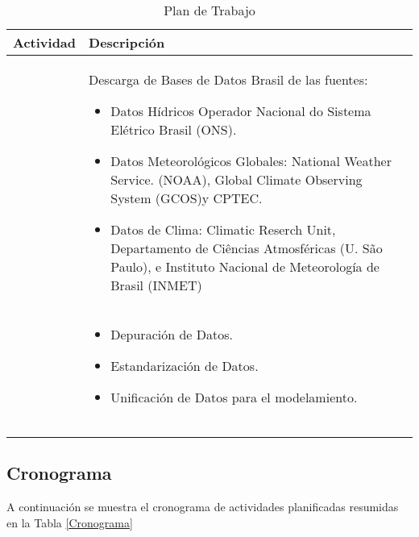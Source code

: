 \documentclass[10pt,a4paper]{article}
\begin{document}
\begin{table}[h!]
\centering

\label{TablaPlan}
\begin{tabular}{|m{2.4cm}|p{7.4cm}|}
\hline
Actividad  & Descripción  \\ \hline

\centering{Obtención de Datos} &  Descarga de Bases de Datos Brasil de las fuentes: 

\begin{itemize}

\item Datos Hídricos Operador Nacional do Sistema Elétrico Brasil (ONS).
\item Datos Meteorológicos Globales: National Weather Service. (NOAA), Global Climate Observing System (GCOS)y CPTEC.
\item Datos de Clima: Climatic Reserch Unit, Departamento de Ciências Atmosféricas (U. São Paulo), e Instituto Nacional de Meteorología de Brasil (INMET)
\end{itemize}

 \\ \hline

\centering{Tratamiento de Datos}  &  

\begin{itemize}
\item Depuración de Datos.
\item Estandarización de Datos.
\item Unificación de Datos para el modelamiento.
\end{itemize}

 \\ \hline


\centering{Análisis y Modelamiento} &   \\ \hline

\centering{Automatización} &  \\ \hline
\centering{Conclusiones y Recomendaciones} &  \\ \hline
\end{tabular}
\caption{Plan de Trabajo}
\end{table}



\subsection{Cronograma}

A continuación se muestra el cronograma de actividades planificadas resumidas en la Tabla \ref{Cronograma}
\end{document}

